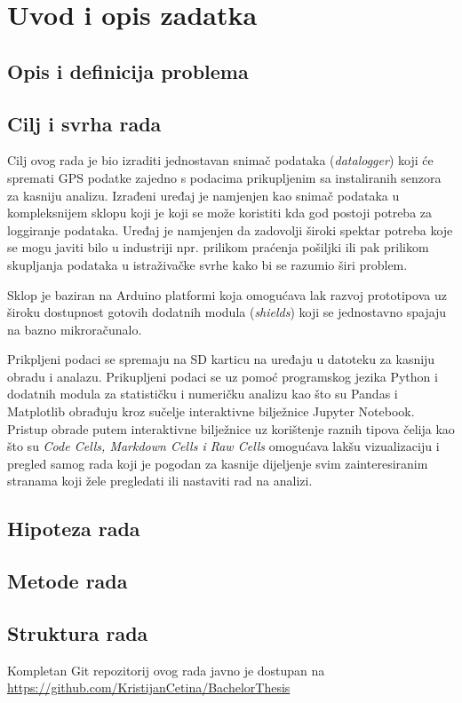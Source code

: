 \chapter{Uvod i opis zadatka}\label{OpisIOgranicenja}

\section{Opis i definicija problema}

\section{Cilj i svrha rada}
Cilj ovog rada je bio izraditi jednostavan snimač podataka (\textit{datalogger}) koji će spremati GPS podatke zajedno s podacima prikupljenim sa instaliranih senzora za kasniju analizu.
Izrađeni uređaj je namjenjen kao snimač podataka u kompleksnijem sklopu koji je koji se može koristiti kda god postoji potreba za loggiranje podataka.
Uređaj je namjenjen da zadovolji široki spektar potreba koje se mogu javiti bilo u industriji npr. prilikom praćenja pošiljki ili pak prilikom skupljanja podataka u istraživačke svrhe kako bi se razumio širi problem.

Sklop je baziran na Arduino platformi koja omogućava lak razvoj prototipova uz široku dostupnost gotovih dodatnih modula (\textit{shields}) koji se jednostavno spajaju na bazno mikroračunalo.

Prikpljeni podaci se spremaju na SD karticu na uređaju u datoteku za kasniju obradu i analazu.
Prikupljeni podaci se uz pomoć programskog jezika Python i dodatnih modula za statističku i numeričku analizu kao što su Pandas i Matplotlib obrađuju kroz sučelje interaktivne bilježnice Jupyter Notebook.
Pristup obrade putem interaktivne bilježnice uz korištenje raznih tipova čelija kao što su \textit{Code Cells, Markdown Cells i Raw Cells} omogućava lakšu vizualizaciju i pregled samog rada koji je pogodan za kasnije dijeljenje svim zainteresiranim stranama koji žele pregledati ili nastaviti rad na analizi.

\section{Hipoteza rada}

\section{Metode rada}

\section{Struktura rada}
Kompletan Git repozitorij ovog rada javno je dostupan na \url{https://github.com/KristijanCetina/BachelorThesis}